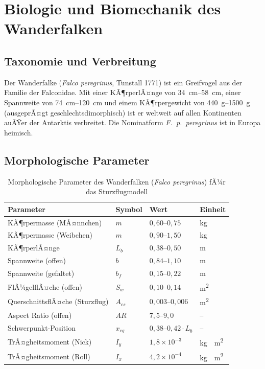 ﻿\documentclass[12pt,a4paper]{article}
\theoremstyle{remark}
\begin{document}
	\section{Biologie und Biomechanik des Wanderfalken}
	\label{sec:biologie}
	
	\subsection{Taxonomie und Verbreitung}
	
	Der Wanderfalke (\textit{Falco peregrinus}, Tunstall 1771) ist ein Greifvogel aus der Familie der Falconidae. Mit einer KÃ¶rperlÃ¤nge von \SIrange{34}{58}{\cm}, einer Spannweite von \SIrange{74}{120}{\cm} und einem KÃ¶rpergewicht von \SIrange{440}{1500}{\g} (ausgeprÃ¤gt geschlechtsdimorphisch) ist er weltweit auf allen Kontinenten auÃŸer der Antarktis verbreitet. Die Nominatform \textit{F.~p.~peregrinus} ist in Europa heimisch.
	
	\subsection{Morphologische Parameter}
	
	\begin{table}[H]
		\centering
		\caption{Morphologische Parameter des Wanderfalken (\textit{Falco peregrinus}) fÃ¼r das Sturzflugmodell}
		\label{tab:morphologie}
		\begin{tabular}{llll}
			\toprule
			\textbf{Parameter} & \textbf{Symbol} & \textbf{Wert} & \textbf{Einheit} \\
			\midrule
			KÃ¶rpermasse (MÃ¤nnchen) & $m$ & $0{,}60$--$0{,}75$ & \si{\kg} \\
			KÃ¶rpermasse (Weibchen) & $m$ & $0{,}90$--$1{,}50$ & \si{\kg} \\
			KÃ¶rperlÃ¤nge & $L_b$ & $0{,}38$--$0{,}50$ & \si{\m} \\
			Spannweite (offen) & $b$ & $0{,}84$--$1{,}10$ & \si{\m} \\
			Spannweite (gefaltet) & $b_f$ & $0{,}15$--$0{,}22$ & \si{\m} \\
			FlÃ¼gelflÃ¤che (offen) & $S_w$ & $0{,}10$--$0{,}14$ & \si{\m^2} \\
			QuerschnittsflÃ¤che (Sturzflug) & $A_{cs}$ & $0{,}003$--$0{,}006$ & \si{\m^2} \\
			Aspect Ratio (offen) & $AR$ & $7{,}5$--$9{,}0$ & -- \\
			Schwerpunkt-Position & $x_{cg}$ & $0{,}38$--$0{,}42 \cdot L_b$ & -- \\
			TrÃ¤gheitsmoment (Nick) & $I_y$ & $1{,}8 \times 10^{-3}$ & \si{\kg \cdot \m^2} \\
			TrÃ¤gheitsmoment (Roll) & $I_x$ & $4{,}2 \times 10^{-4}$ & \si{\kg \cdot \m^2} \\
			\bottomrule
		\end{tabular}
	\end{table}
	
\end{document}
